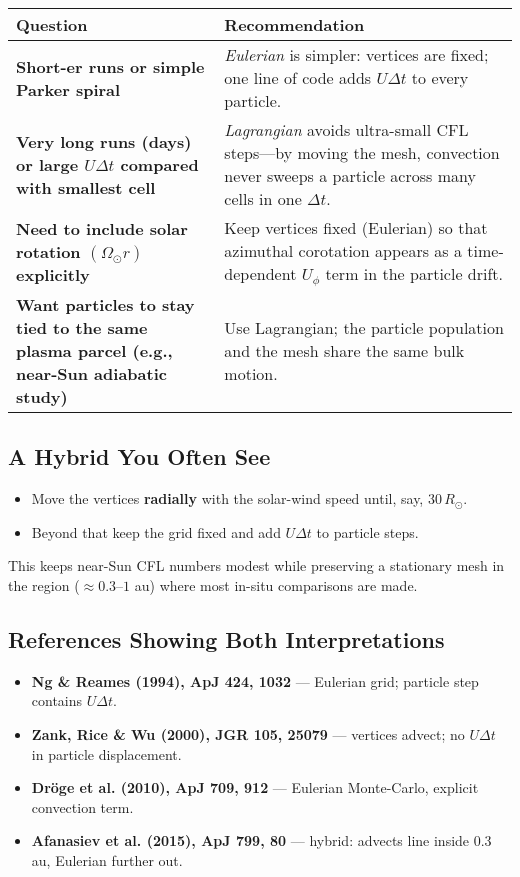 \begin{table}[h!]
\centering
\begin{tabular}{|p{8cm}|p{6cm}|}
\hline
\textbf{Question} & \textbf{Recommendation} \\
\hline
\textbf{Short-er runs or simple Parker spiral} & \emph{Eulerian} is simpler: vertices are fixed; one line of code adds $U\Delta t$ to every particle. \\
\hline
\textbf{Very long runs (days) or large $U\Delta t$ compared with smallest cell} & \emph{Lagrangian} avoids ultra-small CFL steps—by moving the mesh, convection never sweeps a particle across many cells in one $\Delta t$. \\
\hline
\textbf{Need to include solar rotation $(\Omega_\odot r)$ explicitly} & Keep vertices fixed (Eulerian) so that azimuthal corotation appears as a time-dependent $U_\phi$ term in the particle drift. \\
\hline
\textbf{Want particles to stay tied to the same plasma parcel (e.g., near-Sun adiabatic study)} & Use Lagrangian; the particle population and the mesh share the same bulk motion. \\
\hline
\end{tabular}
\end{table}

\subsection*{A Hybrid You Often See}

\begin{itemize}
\item Move the vertices \textbf{radially} with the solar-wind speed until, say, $30\,R_\odot$.
\item Beyond that keep the grid fixed and add $U\Delta t$ to particle steps.
\end{itemize}

This keeps near-Sun CFL numbers modest while preserving a stationary mesh in the region ($\approx 0.3$--$1$ au) where most in-situ comparisons are made.

\subsection*{References Showing Both Interpretations}

\begin{itemize}
\item \textbf{Ng \& Reames (1994), ApJ 424, 1032} — Eulerian grid; particle step contains $U\Delta t$.
\item \textbf{Zank, Rice \& Wu (2000), JGR 105, 25079} — vertices advect; no $U\Delta t$ in particle displacement.
\item \textbf{Dröge et al. (2010), ApJ 709, 912} — Eulerian Monte-Carlo, explicit convection term.
\item \textbf{Afanasiev et al. (2015), ApJ 799, 80} — hybrid: advects line inside 0.3 au, Eulerian further out.
\end{itemize}

